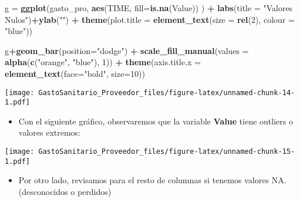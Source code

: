 \documentclass[]{article}
\newenvironment{Shaded}{\begin{snugshade}}{\end{snugshade}}
\newcommand{\DataTypeTok}[1]{\textcolor[rgb]{0.13,0.29,0.53}{#1}}
\newcommand{\DecValTok}[1]{\textcolor[rgb]{0.00,0.00,0.81}{#1}}
\newcommand{\KeywordTok}[1]{\textcolor[rgb]{0.13,0.29,0.53}{\textbf{#1}}}
\newcommand{\NormalTok}[1]{#1}
\newcommand{\OperatorTok}[1]{\textcolor[rgb]{0.81,0.36,0.00}{\textbf{#1}}}
\newcommand{\StringTok}[1]{\textcolor[rgb]{0.31,0.60,0.02}{#1}}
\providecommand{\tightlist}{%
  \setlength{\itemsep}{0pt}\setlength{\parskip}{0pt}}
\begin{document}
\begin{Shaded}
\begin{Highlighting}[]
\NormalTok{g =}\StringTok{ }\KeywordTok{ggplot}\NormalTok{(gasto_pro, }\KeywordTok{aes}\NormalTok{(TIME, }\DataTypeTok{fill=}\KeywordTok{is.na}\NormalTok{(Value)) ) }\OperatorTok{+}
\KeywordTok{labs}\NormalTok{(}\DataTypeTok{title =} \StringTok{"Valores Nulos"}\NormalTok{)}\OperatorTok{+}\KeywordTok{ylab}\NormalTok{(}\StringTok{""}\NormalTok{) }\OperatorTok{+}
\KeywordTok{theme}\NormalTok{(}\DataTypeTok{plot.title =} \KeywordTok{element_text}\NormalTok{(}\DataTypeTok{size =} \KeywordTok{rel}\NormalTok{(}\DecValTok{2}\NormalTok{), }\DataTypeTok{colour =} \StringTok{"blue"}\NormalTok{))}

\NormalTok{g}\OperatorTok{+}\KeywordTok{geom_bar}\NormalTok{(}\DataTypeTok{position=}\StringTok{"dodge"}\NormalTok{) }\OperatorTok{+}\StringTok{ }\KeywordTok{scale_fill_manual}\NormalTok{(}\DataTypeTok{values =} \KeywordTok{alpha}\NormalTok{(}\KeywordTok{c}\NormalTok{(}\StringTok{"orange"}\NormalTok{, }\StringTok{"blue"}\NormalTok{), }\DecValTok{1}\NormalTok{)) }\OperatorTok{+}
\KeywordTok{theme}\NormalTok{(}\DataTypeTok{axis.title.x =} \KeywordTok{element_text}\NormalTok{(}\DataTypeTok{face=}\StringTok{"bold"}\NormalTok{, }\DataTypeTok{size=}\DecValTok{10}\NormalTok{))}
\end{Highlighting}
\end{Shaded}

\texttt{[image: GastoSanitario\_Proveedor\_files/figure-latex/unnamed-chunk-14-1.pdf]}

\begin{itemize}
\tightlist
\item
  Con el siguiente gráfico, observaremos que la variable \textbf{Value}
  tiene outliers o valores extremos:
\end{itemize}

\begin{Shaded}
\end{Shaded}

\texttt{[image: GastoSanitario\_Proveedor\_files/figure-latex/unnamed-chunk-15-1.pdf]}

\begin{itemize}
\tightlist
\item
  Por otro lado, revisamos para el resto de columnas si tenemos valores
  NA.(desconocidos o perdidos)
\end{itemize}
\end{document}
